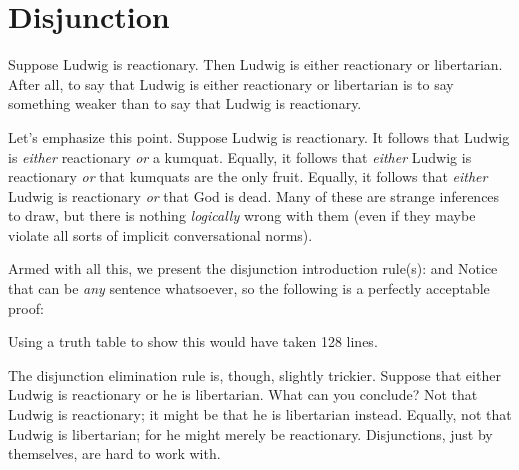 \section{Disjunction}
Suppose Ludwig is reactionary. Then Ludwig is either reactionary or libertarian. After all, to say that Ludwig is either reactionary or libertarian is to say something weaker than to say that Ludwig is reactionary. 

Let's emphasize this point. Suppose Ludwig is reactionary. It follows that Ludwig is \emph{either} reactionary \emph{or} a kumquat. Equally, it follows that \emph{either} Ludwig is reactionary \emph{or} that kumquats are the only fruit.  Equally, it follows that \emph{either} Ludwig is reactionary \emph{or} that God is dead. Many of these are strange inferences to draw, but there is nothing \emph{logically} wrong with them (even if they maybe violate all sorts of implicit conversational norms).

Armed with all this, we present the disjunction introduction rule(s):
and
Notice that  can be \emph{any} sentence whatsoever, so the following is a perfectly acceptable proof:
\begin{fitchproof}
\end{fitchproof}
Using a truth table to show this would have taken 128 lines.

The disjunction elimination rule is, though, slightly trickier. Suppose that either Ludwig is reactionary or he is libertarian. What can you conclude? Not that Ludwig is reactionary; it might be that he is libertarian instead. Equally, not that Ludwig is libertarian; for he might merely be reactionary. Disjunctions, just by themselves, are hard to work with. 

